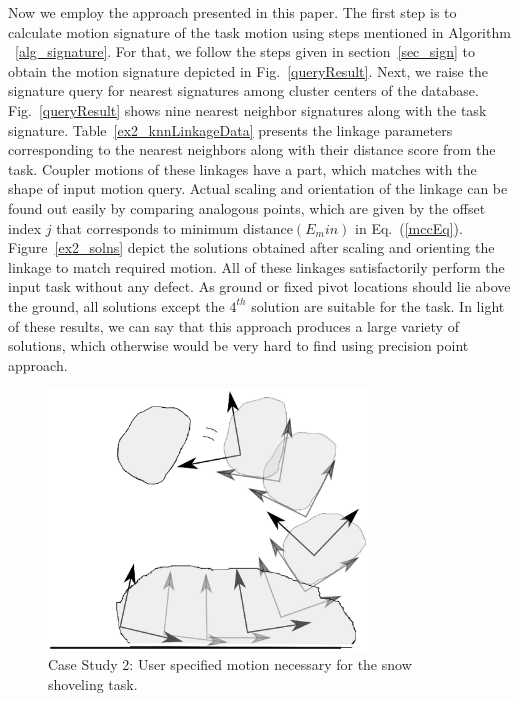 \documentclass[twocolumn,10pt]{asme2ej}
\newcommand{\req}[1]{(\ref{#1})}
\begin{document}
Now we employ the approach presented in this paper.
The first step is to calculate motion signature of the task motion using steps mentioned in Algorithm ~\ref{alg_signature}.
For that, we follow the steps given in section~\ref{sec_sign} to obtain the motion signature depicted in Fig.~\ref{queryResult}.
Next, we raise the signature query for nearest signatures among cluster centers of the database.
Fig.~\ref{queryResult} shows nine nearest neighbor signatures along with the task signature.
Table~\ref{ex2_knnLinkageData} presents the linkage parameters corresponding to the nearest neighbors along with their distance score from the task.
Coupler motions of these linkages have a part, which matches with the shape of input motion query.
Actual scaling and orientation of the linkage can be found out easily by comparing analogous points, which are given by the offset index $j$ that corresponds to minimum distance$(E_min)$ in Eq.~\req{mccEq}.
Figure~\ref{ex2_solns} depict the solutions obtained after scaling and orienting the linkage to match required motion.
All of these linkages satisfactorily perform the input task without any defect.
As ground or fixed pivot locations should lie above the ground, all solutions except the $4^{th}$ solution are suitable for the task.
In light of these results, we can say that this approach produces a large variety of solutions, which otherwise would be very hard to find using precision point approach.

\begin{figure}
\centering
\includegraphics[width=240pt]{figure/fig_motion_query.eps}
  \caption{Case Study 2: User specified motion necessary for the snow shoveling task.}
\label{motionQuery}
\end{figure}
\end{document}
